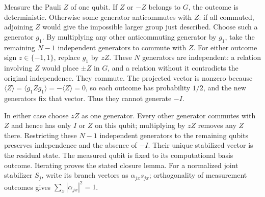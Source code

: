 \documentclass[11pt]{article}
\begin{document}
Measure the Pauli $Z$ of one qubit. If $Z$ or $-Z$ belongs to
$G$, the outcome is deterministic. Otherwise some generator
anticommutes with $Z$: if all commuted, adjoining $Z$ would
give the impossible larger group just described. Choose such a
generator $g_1$. By multiplying any other anticommuting generator
by $g_1$, take the remaining $N-1$ independent generators to
commute with $Z$. For either outcome sign $z\in\{-1,1\}$,
replace $g_1$ by $zZ$. These $N$ generators are independent:
a relation involving $Z$ would place $\pm Z$ in $G$, and a
relation without it contradicts the original independence.
They commute. The projected vector is nonzero because
$\langle Z\rangle=\langle g_1Zg_1\rangle=-\langle Z\rangle=0$,
so each outcome has probability $1/2$, and the new generators
fix that vector. Thus they cannot generate $-I$.

In either case choose $zZ$ as one generator. Every other generator
commutes with $Z$ and hence has only $I$ or $Z$ on this qubit;
multiplying by $zZ$ removes any $Z$ there. Restricting these
$N-1$ independent generators to the remaining qubits preserves
independence and the absence of $-I$. Their unique stabilized
vector is the residual state. The measured qubit is fixed to its
computational basis outcome. Iterating proves the stated closure
lemma. For a normalized joint stabilizer $S_j$, write its branch
vectors as $\alpha_{jx}s_{jx}$; orthogonality of measurement
outcomes gives $\sum_x|\alpha_{jx}|^2=1$.
\end{document}
